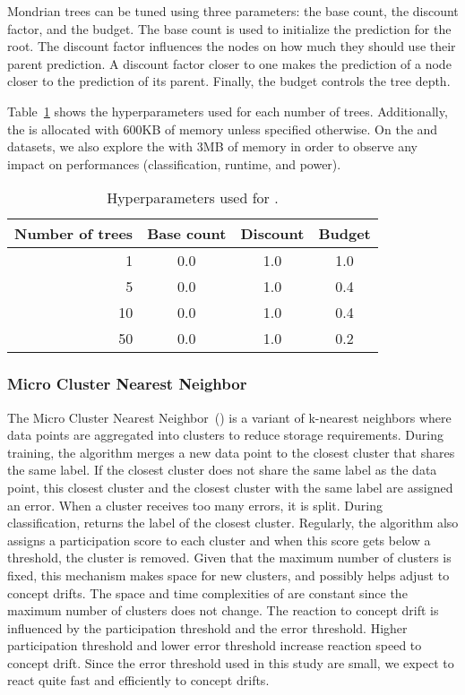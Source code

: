Mondrian trees can be tuned using three
parameters: the base count, the discount factor,
and the budget. The base count is used to
initialize the prediction for the root. The
discount factor influences the nodes on how much
they should use their parent prediction. A
discount factor closer to one makes the prediction
of a node closer to the prediction of its parent.
Finally, the budget controls the tree depth.

Table~\ref{table:hyperparameter-mondrian} shows
the hyperparameters used for each number of trees.
Additionally, the \mondrianforest is allocated
with 600KB of memory unless specified otherwise.
On the \banosdataset and \recofitdataset datasets,
we also explore the \mondrianforest with 3MB of
memory in order to observe any impact on
performances (classification, runtime, and power).
\begin{table}
	\begin{center}
		\begin{tabular}{|| r | c | c | c ||} 
			\hline
			Number of trees &  Base count & Discount & Budget \\ [0.5ex] 
			\hline\hline
			1 & 0.0 & 1.0 & 1.0 \\
			5 & 0.0 & 1.0 & 0.4 \\
			10 & 0.0 & 1.0 & 0.4 \\
			50 & 0.0 & 1.0 & 0.2 \\
			\hline
		\end{tabular}
	\end{center}
	\caption{Hyperparameters used for \mondrianforest.}
		\label{table:hyperparameter-mondrian}
\end{table}
\subsubsection{Micro Cluster Nearest Neighbor~\cite{mc-nn}}
The Micro Cluster Nearest Neighbor~(\mcnn) is a
variant of k-nearest neighbors where data points
are aggregated into clusters to reduce storage
requirements.  During training, the algorithm
merges a new data point to the closest cluster
that shares the same label. If the closest cluster
does not share the same label as the data point,
this closest cluster and the closest cluster with
the same label are assigned an error. When a
cluster receives too many errors, it is split.
During classification, \mcnn returns the label of
the closest cluster.  Regularly, the algorithm
also assigns a participation score to each cluster
and when this score gets below a threshold, the
cluster is removed. Given that the maximum number
of clusters is fixed, this mechanism makes
space for new clusters, and possibly
helps adjust to concept drifts.  
The space and time complexities of \mcnn are
constant since the maximum number of clusters does
not change.
The reaction to concept drift is influenced by the
participation threshold and the error threshold.
Higher participation threshold and lower error
threshold increase reaction speed to concept
drift. Since the error threshold used in this
study are small, we expect \mcnn to react quite
fast and efficiently to concept drifts.

